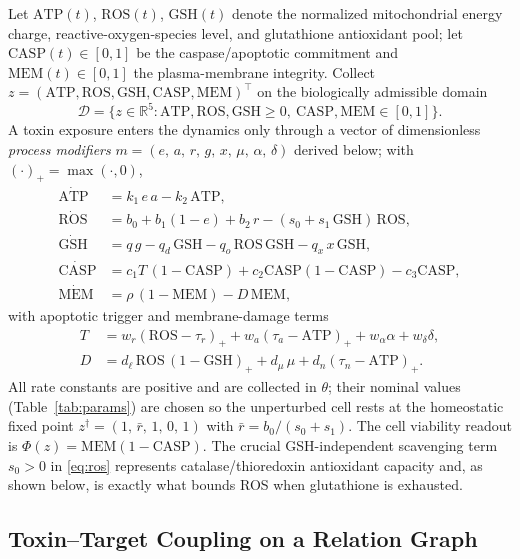 \documentclass[journal]{IEEEtran}
\newcommand{\R}{\mathbb{R}}
\newcommand{\relu}[1]{(#1)_{+}}
\begin{document}
Let $\mathrm{ATP}(t)$, $\mathrm{ROS}(t)$, $\mathrm{GSH}(t)$ denote the normalized
mitochondrial energy charge, reactive-oxygen-species level, and glutathione
antioxidant pool; let $\mathrm{CASP}(t)\in[0,1]$ be the caspase/apoptotic
commitment and $\mathrm{MEM}(t)\in[0,1]$ the plasma-membrane integrity. Collect
$z=(\mathrm{ATP},\mathrm{ROS},\mathrm{GSH},\mathrm{CASP},\mathrm{MEM})^{\top}$ on
the biologically admissible domain
\[
\mathcal{D}=\{z\in\R^5: \mathrm{ATP},\mathrm{ROS},\mathrm{GSH}\ge0,\ \mathrm{CASP},\mathrm{MEM}\in[0,1]\}.
\]
A toxin exposure enters the dynamics only through a vector of dimensionless
\emph{process modifiers}
$m=(e,\,a,\,r,\,g,\,x,\,\mu,\,\alpha,\,\delta)$ derived below; with $\relu{\cdot}=\max(\cdot,0)$,
\begin{align}
\dot{\mathrm{ATP}} &= k_1\,e\,a - k_2\,\mathrm{ATP}, \label{eq:atp}\\
\dot{\mathrm{ROS}} &= b_0 + b_1(1-e) + b_2\,r - (s_0 + s_1\,\mathrm{GSH})\,\mathrm{ROS}, \label{eq:ros}\\
\dot{\mathrm{GSH}} &= q\,g - q_d\,\mathrm{GSH} - q_o\,\mathrm{ROS}\,\mathrm{GSH} - q_x\,x\,\mathrm{GSH}, \label{eq:gsh}\\
\dot{\mathrm{CASP}} &= c_1 T\,(1-\mathrm{CASP}) + c_2 \mathrm{CASP}(1-\mathrm{CASP}) - c_3 \mathrm{CASP}, \label{eq:casp}\\
\dot{\mathrm{MEM}} &= \rho\,(1-\mathrm{MEM}) - D\,\mathrm{MEM}, \label{eq:mem}
\end{align}
with apoptotic trigger and membrane-damage terms
\begin{align}
T &= w_r\relu{\mathrm{ROS}-\tau_r} + w_a\relu{\tau_a-\mathrm{ATP}} + w_\alpha\alpha + w_\delta\delta, \label{eq:trigger}\\
D &= d_\ell\,\mathrm{ROS}\,\relu{1-\mathrm{GSH}} + d_\mu\,\mu + d_n\relu{\tau_n-\mathrm{ATP}}. \label{eq:damage}
\end{align}
All rate constants are positive and are collected in $\theta$; their nominal
values (Table~\ref{tab:params}) are chosen so the unperturbed cell rests at the
homeostatic fixed point $z^\dagger=(1,\,\bar r,\,1,\,0,\,1)$ with
$\bar r = b_0/(s_0+s_1)$. The cell viability readout is $\Phi(z)=\mathrm{MEM}(1-\mathrm{CASP})$.
The crucial GSH-independent scavenging term $s_0>0$ in \eqref{eq:ros} represents
catalase/thioredoxin antioxidant capacity and, as shown below, is exactly what
bounds ROS when glutathione is exhausted.

\subsection{Toxin--Target Coupling on a Relation Graph}
\end{document}
